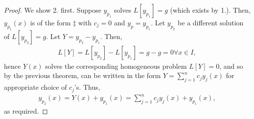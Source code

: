 \begin{proof}
    We show 2. first. Suppose $y_{p_1}$ solves $L[y_{p_1}] = g$ (which exists by 1.). Then, $y_{p_1}(x)$ is of the form $\ddagger$ with $c_j = 0$ and $y_p = y_{p_1}$. Let $y_{p_2}$ be a different solution of $L[y_{p_2}] = g$. Let $Y = y_{p_2} - y_{p_1}$. Then, \begin{align*}
        L[Y] = L[y_{p_2}] - L[y_{p_1}] = g - g = 0 \forall x \in I,
    \end{align*}
    hence $Y(x)$ solves the corresponding homogeneous problem $L[Y] = 0$, and so by the previous theorem, can be written in the form $Y = \sum_{j=1}^n c_j y_j(x)$ for appropriate choice of $c_j$'s. Thus, \begin{align*}
        y_{p_2}(x) = Y(x)+y_{p_1}(x) = \sum_{j=1}^n c_j y_j(x) + y_{p_1}(x),
    \end{align*}
    as required.


\end{proof}

